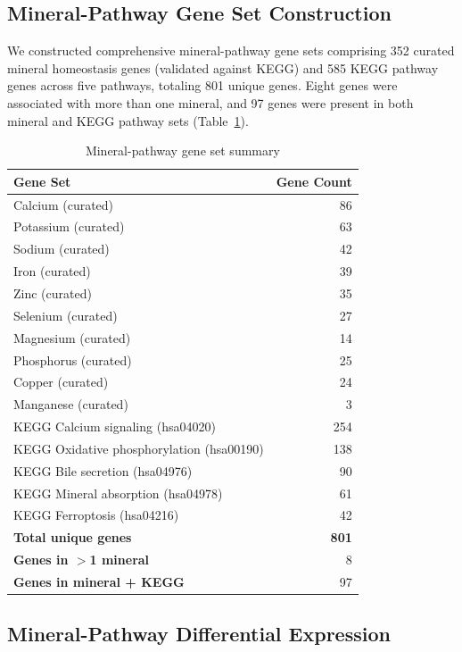 \documentclass[11pt,a4paper]{article}
\begin{document}
\subsection{Mineral-Pathway Gene Set Construction}

We constructed comprehensive mineral-pathway gene sets comprising 352 curated mineral homeostasis genes (validated against KEGG) and 585 KEGG pathway genes across five pathways, totaling 801 unique genes. Eight genes were associated with more than one mineral, and 97 genes were present in both mineral and KEGG pathway sets (Table~\ref{tab:genesets}).

\begin{table}[H]
\centering
\caption{Mineral-pathway gene set summary}
\label{tab:genesets}
\begin{tabular}{lr}
\toprule
\textbf{Gene Set} & \textbf{Gene Count} \\
\midrule
Calcium (curated) & 86 \\
Potassium (curated) & 63 \\
Sodium (curated) & 42 \\
Iron (curated) & 39 \\
Zinc (curated) & 35 \\
Selenium (curated) & 27 \\
Magnesium (curated) & 14 \\
Phosphorus (curated) & 25 \\
Copper (curated) & 24 \\
Manganese (curated) & 3 \\
\midrule
KEGG Calcium signaling (hsa04020) & 254 \\
KEGG Oxidative phosphorylation (hsa00190) & 138 \\
KEGG Bile secretion (hsa04976) & 90 \\
KEGG Mineral absorption (hsa04978) & 61 \\
KEGG Ferroptosis (hsa04216) & 42 \\
\midrule
\textbf{Total unique genes} & \textbf{801} \\
\textbf{Genes in $>$1 mineral} & 8 \\
\textbf{Genes in mineral + KEGG} & 97 \\
\bottomrule
\end{tabular}
\end{table}

\subsection{Mineral-Pathway Differential Expression}
\end{document}
